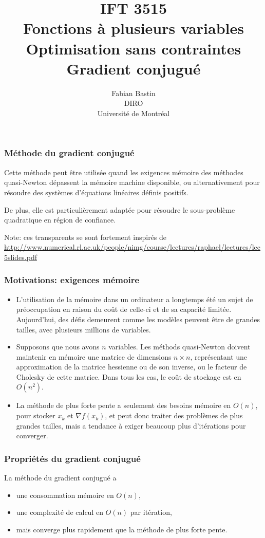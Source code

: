 \documentclass[usepdftitle=false]{beamer}
\title[IFT3515]{IFT 3515\\Fonctions à plusieurs variables\\Optimisation sans contraintes\\Gradient conjugué}
\author[Fabian Bastin]{Fabian Bastin\\DIRO\\Université de Montréal}
\date{}
\begin{document}
\frame{\titlepage}


\begin{frame}
\frametitle{Méthode du gradient conjugué}

Cette méthode peut être utilisée quand les exigences mémoire des méthodes quasi-Newton dépassent la mémoire machine disponible, ou alternativement pour résoudre des systèmes d'équations linéaires définis positifs.

\mbox{}

De plus, elle est particulièrement adaptée pour résoudre le sous-problème quadratique en région de confiance.

\mbox{}

Note: ces transparents se sont fortement inspirés de
\url{http://www.numerical.rl.ac.uk/people/nimg/course/lectures/raphael/lectures/lec5slides.pdf}

\end{frame}

\begin{frame}
\frametitle{Motivations: exigences mémoire}

\begin{itemize}
\item
L'utilisation de la mémoire dans un ordinateur a longtemps été un sujet de préoccupation en raison du coût de celle-ci et de sa capacité limitée. Aujourd'hui, des défis demeurent comme les modèles peuvent être de grandes tailles, avec plusieurs millions de variables.
\item
Supposons que nous avons $n$ variables.
Les méthods quasi-Newton doivent maintenir en mémoire une matrice de dimensions $n \times n$, représentant une approximation de la matrice hessienne ou de son inverse, ou le facteur de Cholesky de cette matrice. Dans tous les cas, le coût de stockage est en $O(n^2)$.
\item
La méthode de plus forte pente a seulement des besoins mémoire en $O(n)$, pour stocker $x_k$ et $\nabla f(x_k)$, et peut donc traiter des problèmes de plus grandes tailles, mais a tendance à exiger beaucoup plus d'itérations pour converger.
\end{itemize}

\end{frame}

\begin{frame}
\frametitle{Propriétés du gradient conjugué}

La méthode du gradient conjugué a
\begin{itemize}
\item
une consommation mémoire en $O(n)$,
\item
une complexité de calcul en $O(n)$ par itération,
\item
mais converge plus rapidement que la méthode de plus forte pente.
\end{itemize}

\end{frame}
\end{document}
